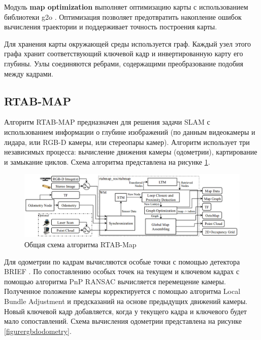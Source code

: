 \documentclass{mipt-thesis-ms}
\begin{document}
	Модуль \textbf{map optimization} выполняет оптимизацию карты с использованием библиотеки g2o \cite{grisetti2011g2o}. Оптимизация позволяет предотвратить накопление ошибок вычисления траектории и поддерживает точность построения карты.
	
	Для хранения карты окружающей среды используется граф. Каждый узел этого графа хранит соответствующий ключевой кадр и инвертированную карту его глубины. Узлы соединяются ребрами, содержащими преобразование подобия между кадрами.
	
	\subsection{RTAB-MAP}
	\label{section_rtabmap}
	
	Алгоритм RTAB-MAP \cite{labbe2011memory} предназначен для решения задачи SLAM с использованием информации о глубине изображений (по данным видеокамеры и лидара, или RGB-D камеры, или стереопары камер). Алгоритм использует три независимых процесса: вычисление движения камеры (одометрии), картирование и замыкание циклов. Схема алгоритма представлена на рисунке \ref{figurertabmap}.
	
	\begin{figure}
		\centering
		\includegraphics[scale=0.4]{img/rtabmap_scheme.png}
		\caption{Общая схема алгоритма RTAB-Map}
		\label{figurertabmap}
	\end{figure}
	
	Для одометрии по кадрам вычисляются особые точки с помощью детектора BRIEF \cite{calonder2010brief}. По сопоставлению особых точек на текущем и ключевом кадрах с помощью алгоритма PnP RANSAC \cite{brachmann2017dsac} вычисляется перемещение камеры. Полученное положение камеры корректируется с помощью алгоритма Local Bundle Adjustment \cite{zhang2006incremental} и предсказаний на основе предыдущих движений камеры. Новый ключевой кадр добавляется, когда у текущего кадра и ключевого будет мало сопоставлений. Схема вычисления одометрии представлена на рисунке \ref{figurergbdodometry}.
	
\end{document}
